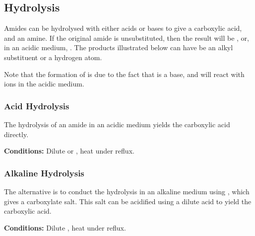 


		\subsection{Hydrolysis}

			Amides can be hydrolysed with either acids or bases to give a carboxylic acid, and an amine. If the original amide is unsubstituted,
			then the result will be , or, in an acidic medium, . The products illustrated below can have  be an alkyl
			substituent or a hydrogen atom.

			Note that the formation of  is due to the fact that  is a base, and will react with  ions in the acidic
			medium.

			\subsubsection{Acid Hydrolysis}

				The hydrolysis of an amide in an acidic medium yields the carboxylic acid directly.

				\vspace{1.5em}
				\vbox{\textbf{Conditions:}	\tabto{35mm}Dilute  or , heat under reflux.}



			\subsubsection{Alkaline Hydrolysis}

				The alternative is to conduct the hydrolysis in an alkaline medium using , which gives a carboxylate salt.
				This salt can be acidified using a dilute acid to yield the carboxylic acid.

				\vspace{1.5em}
				\vbox{\textbf{Conditions:}	\tabto{35mm}Dilute , heat under reflux.}


